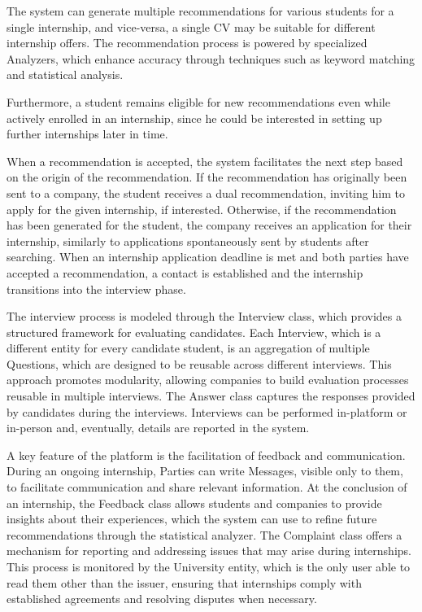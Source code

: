 The system can generate multiple recommendations for various students for a single internship, and vice-versa, a single CV may be suitable for different internship offers. The recommendation process is powered by specialized Analyzers, which enhance accuracy through techniques such as keyword matching and statistical analysis.

Furthermore, a student remains eligible for new recommendations even while actively enrolled in an internship, since he could be interested in setting up further internships later in time.

When a recommendation is accepted, the system facilitates the next step based on the origin of the recommendation. If the recommendation has originally been sent to a company, the student receives a dual recommendation, inviting him to apply for the given internship, if interested.
 Otherwise, if the recommendation has been generated for the student, the company receives an application for their internship, similarly to applications spontaneously sent by students after searching.
 When an internship application deadline is met and both parties have accepted a recommendation, a contact is established and the internship transitions into the interview phase.

The interview process is modeled through the Interview class, which provides a structured framework for evaluating candidates. Each Interview, which is a different entity for every candidate student, is an aggregation of multiple Questions, which are designed to be reusable across different interviews. This approach promotes modularity, allowing companies to build evaluation processes reusable in multiple interviews. The Answer class captures the responses provided by candidates during the interviews. Interviews can be performed in-platform or in-person and, eventually, details are reported in the system.

A key feature of the platform is the facilitation of feedback and communication. 
During an ongoing internship, Parties can write Messages, visible only to them, to facilitate communication and share relevant information.
At the conclusion of an internship, the Feedback class allows students and companies to provide insights about their experiences, which the system can use to refine future recommendations through the statistical analyzer. 
The Complaint class offers a mechanism for reporting and addressing issues that may arise during internships. This process is monitored by the University entity, which is the only user able to read them other than the issuer, ensuring that internships comply with established agreements and resolving disputes when necessary.

